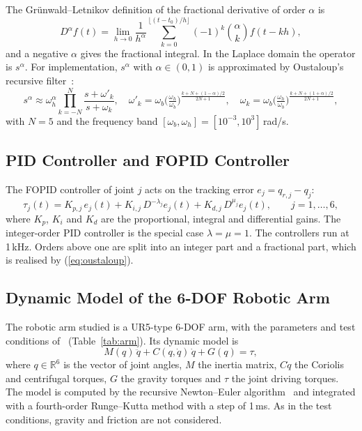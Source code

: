 \documentclass{svproc}
\begin{document}
The Gr\"unwald--Letnikov definition of the fractional derivative of order $\alpha$ is
\begin{equation}
  D^{\alpha} f(t) = \lim_{h \to 0} \frac{1}{h^{\alpha}}
  \sum_{k=0}^{\lfloor (t - t_0)/h \rfloor} (-1)^k \binom{\alpha}{k} f(t - kh),
  \label{eq:gl}
\end{equation}
and a negative $\alpha$ gives the fractional integral. In the Laplace domain the operator is
$s^{\alpha}$. For implementation, $s^{\alpha}$ with $\alpha \in (0,1)$ is approximated by
Oustaloup's recursive filter~\cite{oustaloup2000}:
\begin{equation}
  s^{\alpha} \approx \omega_h^{\alpha} \prod_{k=-N}^{N} \frac{s + \omega'_k}{s + \omega_k},
  \quad
  \omega'_k = \omega_b \Big(\tfrac{\omega_h}{\omega_b}\Big)^{\frac{k + N + (1-\alpha)/2}{2N+1}},
  \quad
  \omega_k = \omega_b \Big(\tfrac{\omega_h}{\omega_b}\Big)^{\frac{k + N + (1+\alpha)/2}{2N+1}},
  \label{eq:oustaloup}
\end{equation}
with $N = 5$ and the frequency band $[\omega_b, \omega_h] = [10^{-3}, 10^{3}]$\,rad/s.

\subsection{PID Controller and FOPID Controller}

The FOPID controller of joint $j$ acts on the tracking error $e_j = q_{r,j} - q_j$:
\begin{equation}
  \tau_j(t) = K_{p,j}\, e_j(t) + K_{i,j}\, D^{-\lambda_j} e_j(t) + K_{d,j}\, D^{\mu_j} e_j(t),
  \qquad j = 1, \dots, 6 ,
  \label{eq:fopid}
\end{equation}
where $K_p$, $K_i$ and $K_d$ are the proportional, integral and differential gains. The
integer-order PID controller is the special case $\lambda = \mu = 1$. The controllers run at
1\,kHz. Orders above one are split into an integer part and a fractional part, which is
realised by (\ref{eq:oustaloup}).

\subsection{Dynamic Model of the 6-DOF Robotic Arm}

The robotic arm studied is a UR5-type 6-DOF arm, with the parameters and test conditions
of~\cite{jiang2025} (Table~\ref{tab:arm}). Its dynamic model is~\cite{siciliano2009}
\begin{equation}
  M(q)\,\ddot q + C(q,\dot q)\,\dot q + G(q) = \tau ,
  \label{eq:dynamics}
\end{equation}
where $q \in \mathbb{R}^6$ is the vector of joint angles, $M$ the inertia matrix, $C\dot q$
the Coriolis and centrifugal torques, $G$ the gravity torques and $\tau$ the joint driving
torques. The model is computed by the recursive Newton--Euler algorithm~\cite{luh1980} and
integrated with a fourth-order Runge--Kutta method with a step of 1\,ms. As in the test
conditions, gravity and friction are not considered.
\end{document}
